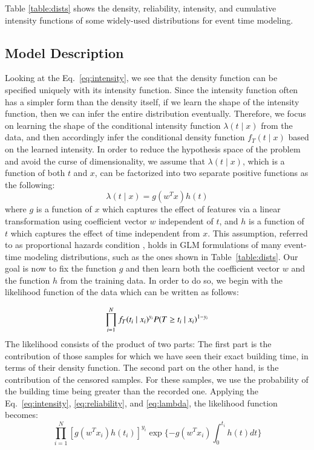 Table \ref{table:dists} shows the density, reliability, intensity, and cumulative intensity functions of some widely-used distributions for event time modeling.

\subsection{Model Description}
Looking at the Eq.~\ref{eq:intensity}, we see that the density function can be specified uniquely with its intensity function. Since the intensity function often has a simpler form than the density itself, if we learn the shape of the intensity function, then we can infer the entire distribution eventually. Therefore, we focus on learning the shape of the conditional intensity function $\lambda(t\mid x)$ from the data, and then accordingly infer the conditional density function $f_T(t\mid x)$ based on the learned intensity.
In order to reduce the hypothesis space of the problem and avoid the curse of dimensionality, we assume that $\lambda(t\mid x)$, which is a function of both $t$ and $x$, can be factorized into two separate positive functions as the following:
\begin{equation}\label{eq:lambda}
\lambda(t\mid x)=g(w^Tx)h(t)
\end{equation}
where $g$ is a function of $x$ which captures the effect of features via a linear transformation using coefficient vector $w$ independent of $t$, and $h$ is a function of $t$ which captures the effect of time independent from $x$. This assumption, referred to as proportional hazards condition \cite{breslow1975analysis}, holds in GLM formulations of many event-time modeling distributions, such as the ones shown in Table~\ref{table:dists}. Our goal is now to fix the function $g$ and then learn both the coefficient vector $w$ and the function $h$ from the training data. In order to do so, we begin with the likelihood function of the data which can be written as follows:

\begin{equation}
\prod_{i=1}^{N}f_T(t_i\mid x_i)^{y_i}P(T\ge t_i\mid x_i)^{1-y_i}\\
\end{equation}
The likelihood consists of the product of two parts: The first part is the contribution of those samples for which we have seen their exact building time, in terms of their density function. The second part on the other hand, is the contribution of the censored samples. For these samples, we use the probability of the building time being greater than the recorded one. Applying the Eq.~\ref{eq:intensity}, \ref{eq:reliability}, and \ref{eq:lambda}, the likelihood function becomes:
\begin{equation}
\prod_{i=1}^{N}\left[g(w^Tx_i)h(t_i)\right]^{y_i}\exp\lbrace-g(w^Tx_i)\int_{0}^{t_i}h(t)dt\rbrace
\end{equation}

